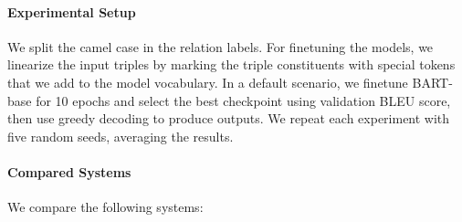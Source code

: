 \paragraph{Experimental Setup} We split the camel case in the relation labels. For finetuning the models, we linearize the input triples by marking the triple constituents with special tokens that we add to the model vocabulary. In a default scenario, we finetune BART-base \cite{lewisBARTDenoisingSequencetoSequence2019} for 10 epochs and select the best checkpoint using validation BLEU score, then use greedy decoding to produce outputs. We repeat each experiment with five random seeds, averaging the results.


\paragraph{Compared Systems} We compare the following systems:
